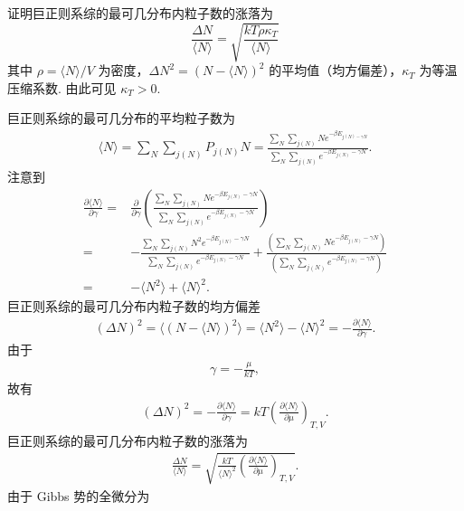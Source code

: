 \documentclass{assignment}
\begin{document}
\begin{prob}
    证明巨正则系综的最可几分布内粒子数的涨落为
    \[
        \frac{\Delta N}{\langle N\rangle}=\sqrt{\frac{kT\rho\kappa_T}{\langle N\rangle}}
    \]
    其中 $\rho=\langle N\rangle/V$ 为密度，$\Delta N^2=(N-\langle N\rangle)^2$ 的平均值（均方偏差），$\kappa_T$ 为等温压缩系数. 由此可见 $\kappa_T>0$.
\end{prob}
\begin{pf}
    巨正则系综的最可几分布的平均粒子数为
    \begin{align}
        \langle N\rangle=\sum_N\sum_{j(N)}P_{j(N)}N=\frac{\sum_N\sum_{j(N)}Ne^{-\beta E_{j(N)-\gamma N}}}{\sum_N\sum_{j(N)}e^{-\beta E_{j(N)}-\gamma N}}.
    \end{align}
    注意到
    \begin{align}
        \frac{\partial\langle N\rangle}{\partial\gamma}=&\frac{\partial}{\partial\gamma}\left(\frac{\sum_N\sum_{j(N)}Ne^{-\beta E_{j(N)}-\gamma N}}{\sum_N\sum_{j(N)}e^{-\beta E_{j(N)}-\gamma N}}\right)\\
        =&-\frac{\sum_N\sum_{j(N)}N^2e^{-\beta E_{j(N)}-\gamma N}}{\sum_N\sum_{j(N)}e^{-\beta E_{j(N)}-\gamma N}}+\frac{\left(\sum_N\sum_{j(N)}Ne^{-\beta E_{j(N)}-\gamma N}\right)}{\left(\sum_N\sum_{j(N)}e^{-\beta E_{j(N)}-\gamma N}\right)}\\
        =&-\langle N^2\rangle+\langle N\rangle^2.
    \end{align}
    巨正则系综的最可几分布内粒子数的均方偏差
    \begin{align}
        (\Delta N)^2=\langle(N-\langle N\rangle)^2\rangle=\langle N^2\rangle-\langle N\rangle^2=-\frac{\partial\langle N\rangle}{\partial\gamma}.
    \end{align}
    由于
    \begin{align}
        \gamma=-\frac{\mu}{kT},
    \end{align}
    故有
    \begin{align}
        (\Delta N)^2=-\frac{\partial\langle N\rangle}{\partial\gamma}=kT\left(\frac{\partial\langle N\rangle}{\partial\mu}\right)_{T,V}.
    \end{align}
    巨正则系综的最可几分布内粒子数的涨落为
    \begin{align}
        \label{3-Nfluctuation}
        \frac{\Delta N}{\langle N\rangle}=\sqrt{\frac{kT}{\langle N\rangle^2}\left(\frac{\partial\langle N\rangle}{\partial\mu}\right)_{T,V}}.
    \end{align}
    由于 Gibbs 势的全微分为
    \begin{align}

\end{align}
\end{pf}
\end{document}
